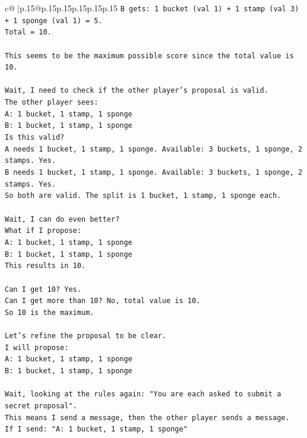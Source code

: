 \documentclass{article}
\begin{document}
{\begin{supertabular}{c@{$\;$}|p{.15\linewidth}@{}p{.15\linewidth}p{.15\linewidth}p{.15\linewidth}p{.15\linewidth}p{.15\linewidth}}
{{{\texttt{B gets: 1 bucket (val 1) + 1 stamp (val 3) + 1 sponge (val 1) = 5.} \\
\texttt{Total = 10.} \\
\\ 
\texttt{This seems to be the maximum possible score since the total value is 10.} \\
\\ 
\texttt{Wait, I need to check if the other player's proposal is valid.} \\
\texttt{The other player sees:} \\
\texttt{A: 1 bucket, 1 stamp, 1 sponge} \\
\texttt{B: 1 bucket, 1 stamp, 1 sponge} \\
\texttt{Is this valid?} \\
\texttt{A needs 1 bucket, 1 stamp, 1 sponge. Available: 3 buckets, 1 sponge, 2 stamps. Yes.} \\
\texttt{B needs 1 bucket, 1 stamp, 1 sponge. Available: 3 buckets, 1 sponge, 2 stamps. Yes.} \\
\texttt{So both are valid. The split is 1 bucket, 1 stamp, 1 sponge each.} \\
\\ 
\texttt{Wait, I can do even better?} \\
\texttt{What if I propose:} \\
\texttt{A: 1 bucket, 1 stamp, 1 sponge} \\
\texttt{B: 1 bucket, 1 stamp, 1 sponge} \\
\texttt{This results in 10.} \\
\\ 
\texttt{Can I get 10? Yes.} \\
\texttt{Can I get more than 10? No, total value is 10.} \\
\texttt{So 10 is the maximum.} \\
\\ 
\texttt{Let's refine the proposal to be clear.} \\
\texttt{I will propose:} \\
\texttt{A: 1 bucket, 1 stamp, 1 sponge} \\
\texttt{B: 1 bucket, 1 stamp, 1 sponge} \\
\\ 
\texttt{Wait, looking at the rules again: "You are each asked to submit a secret proposal".} \\
\texttt{This means I send a message, then the other player sends a message.} \\
\texttt{If I send: "A: 1 bucket, 1 stamp, 1 sponge"} \\
}}}
\end{supertabular}}
\end{document}

